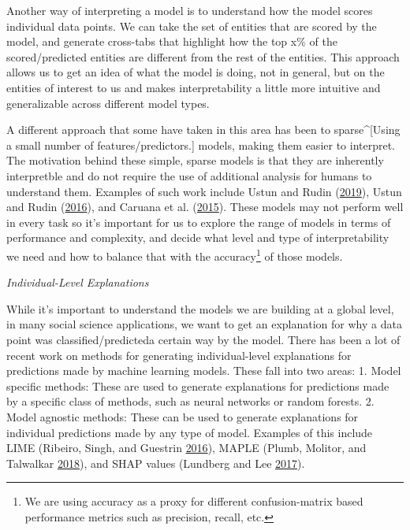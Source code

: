 \documentclass[]{krantz}
\begin{document}
Another way of interpreting a model is to understand how the model
scores individual data points. We can take the set of entities that are
scored by the model, and generate cross-tabs that highlight how the top
x\% of the scored/predicted entities are different from the rest of the
entities. This approach allows us to get an idea of what the model is
doing, not in general, but on the entities of interest to us and makes
interpretability a little more intuitive and generalizable across
different model types.

A different approach that some have taken in this area has been to
sparse\^{}{[}Using a small number of features/predictors.{]} models,
making them easier to interpret. The motivation behind these simple,
sparse models is that they are inherently interpretble and do not
require the use of additional analysis for humans to understand them.
Examples of such work include Ustun and Rudin
(\protect\hyperlink{ref-Ustun2019}{2019}), Ustun and Rudin
(\protect\hyperlink{ref-Ustun2016}{2016}), and Caruana et al.
(\protect\hyperlink{ref-Caruana2015}{2015}). These models may not
perform well in every task so it's important for us to explore the range
of models in terms of performance and complexity, and decide what level
and type of interpretability we need and how to balance that with the
accuracy\footnote{We are using accuracy as a proxy for different
  confusion-matrix based performance metrics such as precision, recall,
  etc.} of those models.

\emph{Individual-Level Explanations}

While it's important to understand the models we are building at a
global level, in many social science applications, we want to get an
explanation for why a data point was classified/predicteda certain way
by the model. There has been a lot of recent work on methods for
generating individual-level explanations for predictions made by machine
learning models. These fall into two areas: 1. Model specific methods:
These are used to generate explanations for predictions made by a
specific class of methods, such as neural networks or random forests. 2.
Model agnostic methods: These can be used to generate explanations for
individual predictions made by any type of model. Examples of this
include LIME (Ribeiro, Singh, and Guestrin
\protect\hyperlink{ref-ribeiro-16}{2016}), MAPLE (Plumb, Molitor, and
Talwalkar \protect\hyperlink{ref-Plumb2018}{2018}), and SHAP values
(Lundberg and Lee \protect\hyperlink{ref-Lundberg2017}{2017}).
\end{document}
